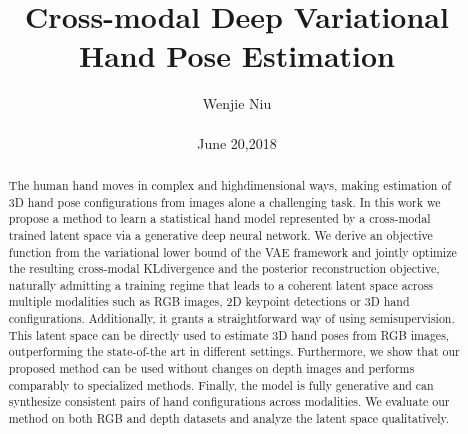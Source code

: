 \documentclass[10pt,twocolumn,letterpaper]{article}
\begin{document}
\title{Cross-modal Deep Variational Hand Pose Estimation}

\author{Wenjie Niu\\\\ June 20,2018}

\maketitle

\begin{abstract}
The human hand moves in complex and highdimensional
ways, making estimation of 3D hand pose configurations
from images alone a challenging task. In this
work we propose a method to learn a statistical hand model
represented by a cross-modal trained latent space via a generative
deep neural network. We derive an objective function
from the variational lower bound of the VAE framework
and jointly optimize the resulting cross-modal KLdivergence
and the posterior reconstruction objective, naturally
admitting a training regime that leads to a coherent
latent space across multiple modalities such as RGB images,
2D keypoint detections or 3D hand configurations.
Additionally, it grants a straightforward way of using semisupervision.
This latent space can be directly used to estimate
3D hand poses from RGB images, outperforming the
state-of-the art in different settings. Furthermore, we show
that our proposed method can be used without changes
on depth images and performs comparably to specialized
methods. Finally, the model is fully generative and can
synthesize consistent pairs of hand configurations across
modalities. We evaluate our method on both RGB and depth
datasets and analyze the latent space qualitatively.\cite{Spurr_2018_CVPR}\par
\end{abstract}

\end{document}
